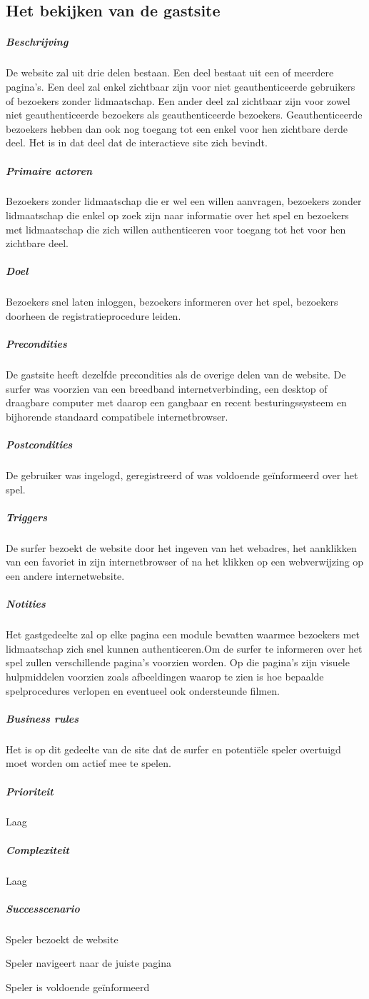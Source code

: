 \subsection{Het bekijken van de gastsite}
\begin{compact}
\subparagraph{Beschrijving}De website zal uit drie delen bestaan. Een deel bestaat uit een of meerdere pagina's. Een deel zal enkel zichtbaar zijn voor niet geauthenticeerde gebruikers of bezoekers zonder lidmaatschap. Een ander deel zal zichtbaar zijn voor zowel niet geauthenticeerde bezoekers als geauthenticeerde bezoekers. Geauthenticeerde bezoekers hebben dan ook nog toegang tot een enkel voor hen zichtbare derde deel. Het is in dat deel dat de interactieve site zich bevindt.
\subparagraph{Primaire actoren} Bezoekers zonder lidmaatschap die er wel een willen aanvragen, bezoekers zonder lidmaatschap die enkel op zoek zijn naar informatie over het spel en bezoekers met lidmaatschap die zich willen authenticeren voor toegang tot het voor hen zichtbare deel.
\subparagraph{Doel} Bezoekers snel laten inloggen, bezoekers informeren over het spel, bezoekers doorheen de registratieprocedure leiden.
\subparagraph{Precondities} De gastsite heeft dezelfde precondities als de overige delen van de website. De surfer was voorzien van een breedband internetverbinding, een desktop of draagbare computer met daarop een gangbaar en recent besturingssysteem en bijhorende standaard compatibele internetbrowser.
\subparagraph{Postcondities} De gebruiker was ingelogd, geregistreerd of was voldoende ge\"informeerd over het spel.
\subparagraph{Triggers} De surfer bezoekt de website door het ingeven van het webadres, het aanklikken van een favoriet in zijn internetbrowser of na het klikken op een webverwijzing op een andere internetwebsite.
\subparagraph{Notities} Het gastgedeelte zal op elke pagina een module bevatten waarmee bezoekers met lidmaatschap zich snel kunnen authenticeren.\small{Om de surfer te informeren over het spel zullen verschillende pagina's voorzien worden. Op die pagina's zijn visuele hulpmiddelen voorzien zoals afbeeldingen waarop te zien is hoe bepaalde spelprocedures verlopen en eventueel ook ondersteunde filmen.}
\subparagraph{Business rules}Het is op dit gedeelte van de site dat de surfer en potenti\"ele speler overtuigd moet worden om actief mee te spelen.
\subparagraph{Prioriteit}Laag
\subparagraph{Complexiteit}Laag
\subparagraph{Successcenario}
\begin{enumerate_compact}
 \item Speler bezoekt de website
 \item Speler navigeert naar de juiste pagina
 \item Speler is voldoende ge\"informeerd
\end{enumerate_compact}
\end{compact}

